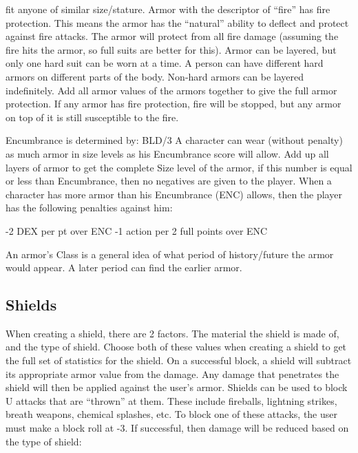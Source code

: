 \documentclass[twoside]{book}
\begin{document}
                 fit anyone of similar size/stature. 
                  Armor with the descriptor of “fire”
                 has fire protection. This means the armor has the
                 “natural” ability to deflect and protect
                 against fire attacks. The armor will protect from all
                 fire damage (assuming the fire hits the armor, so full
                 suits are better for this). 
                  Armor can be layered, but only one hard suit can
                 be worn at a time. A person can have different hard
                 armors on different parts of the body. Non-hard armors
                 can be layered indefinitely. Add all armor values of the
                 armors together to give the full armor protection. If
                 any armor has fire protection, fire will be stopped, but
                 any armor on top of it is still susceptible to the fire.
                 
                Encumbrance is determined by: BLD/3   
                  A character can wear (without penalty) as much
                 armor in size levels as his Encumbrance score will
                 allow. Add up all layers of armor to get the complete
                 Size level of the armor, if this number is equal or less
                 than Encumbrance, then no negatives are given to the
                 player. 
                 When a character has more armor than his
                Encumbrance (ENC) allows, then the player has the
                following penalties against him:
                  
                    -2 DEX per pt over ENC   
                    -1 action per 2 full points over ENC   
                  
                
                  An armor’s Class is a general idea of what
                 period of history/future the armor would appear. A later
                 period can find the earlier armor. 
            
\subsection{Shields}
      
                  When creating a shield, there are 2 factors. The
                 material the shield is made of, and the type of shield.
                 Choose both of these values when creating a shield to
                 get the full set of statistics for the shield. 
                  On a successful block, a shield will subtract its
                 appropriate armor value from the damage. Any damage that
                 penetrates the shield will then be applied against the
                 user’s armor. 
                 Shields can be used to block U attacks that are
                “thrown” at them. These include fireballs,
                lightning strikes, breath weapons, chemical splashes,
                etc. To block one of these attacks, the user must make a
                block roll at -3. If successful, then damage will be
                reduced based on the type of shield:
                  
\end{document}
